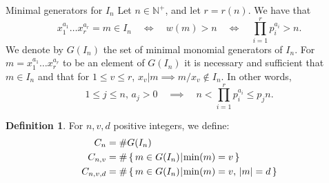 \documentclass[reqno,10pt]{amsart}
\theoremstyle{definition}
\newtheorem{definition}{Definition}[section]
\theoremstyle{remark}
\theoremstyle{plain}
\newcommand{\Nat}{{\mathbb{N}}}
\def\setsuchas#1#2{\left\{\,{#1}\,\vrule\,{#2}\,\right\}}
\newcommand{\tdeg}[1]{\vert#1\rvert}
\newcommand{\divides}[2]{{#1 \left\lvert {#2} \right.}}
\begin{document}
\begin{section}{Minimal generators for \(I_n\)}
  Let \(n \in \Nat^+\), and let \(r=r(n)\).
  We have that
  \begin{equation}
    \label{eqn:trivweight}
    x_1^{a_1} \dots x_r^{a_r} = m \in I_n \quad \iff \quad w(m) > n
    \quad \iff \quad \prod_{i=1}^r p_i^{a_i} > n. 
  \end{equation}
  We denote by \(G(I_n)\) the set of minimal monomial generators of
  \(I_n\). 
  For \(m = x_1^{a_1} \dots x_r^{a_r}\) to be an element of \(G(I_n)\)
  it is necessary and 
  sufficient that \(m \in I_n\) and that for \(1 \le v \le r\), 
  \(\divides{x_v}{m} \implies m/x_v \not \in I_n\). In other words,
  \begin{equation}
    \label{eqn:mingen}
    1 \le j \le n, \, a_j > 0 \quad \implies \quad n < \prod_{i=1}^r
    p_i^{a_i} \le p_j n. 
  \end{equation}

  \begin{definition}
    For \(n,v,d\) positive integers, we define:
    \begin{align}
      C_n &= \#G(I_n) \\ 
    C_{n,v} &= \#\setsuchas{m \in G(I_n)}{\min(m)=v} \\
    C_{n,v,d} &= \#\setsuchas{m \in G(I_n)}{\min(m)=v, \, \tdeg{m}=d}
    \end{align}
  \end{definition}



\end{section}
\end{document}

